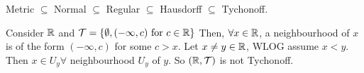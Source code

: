 \begin{rem}
    Metric $\subseteq$ Normal $\subseteq$ Regular $\subseteq$ Hausdorff $\subseteq$ Tychonoff.  
\end{rem} 


\begin{exmp}
    Consider $\mathbb{R}$ and $\mathcal{T} = \left\{ \emptyset, (-\infty, c) \text{ for } c \in \mathbb{R} \right\} $
    Then, $\forall x \in \mathbb{R}$, a neighbourhood of $x$ is of the form $(-\infty, c)$ for some $c > x$.
    Let $x \neq y \in \mathbb{R}$, WLOG assume $x < y$. Then $x \in U_y \forall $ neighbourhood $U_y$ of $y$.
    So $(\mathbb{R}, \mathcal{T})$ is not Tychonoff.   
\end{exmp}

